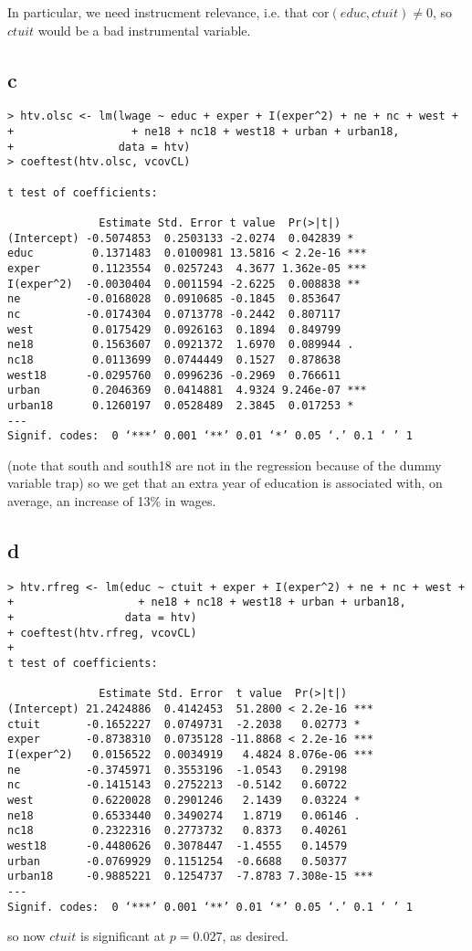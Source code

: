 \documentclass[12pt,letterpaper]{article}
\theoremstyle{definition}
\begin{document}
In particular, we need instrucment relevance, i.e. that $\text{cor}(educ, ctuit) \neq 0$, so $ctuit$ would be a bad instrumental variable.

\subsection*{c}

\begin{Verbatim}[fontsize=\small]
> htv.olsc <- lm(lwage ~ educ + exper + I(exper^2) + ne + nc + west +
+                  + ne18 + nc18 + west18 + urban + urban18,
+                data = htv)
> coeftest(htv.olsc, vcovCL)

t test of coefficients:

              Estimate Std. Error t value  Pr(>|t|)
(Intercept) -0.5074853  0.2503133 -2.0274  0.042839 *
educ         0.1371483  0.0100981 13.5816 < 2.2e-16 ***
exper        0.1123554  0.0257243  4.3677 1.362e-05 ***
I(exper^2)  -0.0030404  0.0011594 -2.6225  0.008838 **
ne          -0.0168028  0.0910685 -0.1845  0.853647
nc          -0.0174304  0.0713778 -0.2442  0.807117
west         0.0175429  0.0926163  0.1894  0.849799
ne18         0.1563607  0.0921372  1.6970  0.089944 .
nc18         0.0113699  0.0744449  0.1527  0.878638
west18      -0.0295760  0.0996236 -0.2969  0.766611
urban        0.2046369  0.0414881  4.9324 9.246e-07 ***
urban18      0.1260197  0.0528489  2.3845  0.017253 *
---
Signif. codes:  0 ‘***’ 0.001 ‘**’ 0.01 ‘*’ 0.05 ‘.’ 0.1 ‘ ’ 1
\end{Verbatim}
(note that south and south18 are not in the regression because of the dummy variable trap) so we get that an extra year of education is associated with, on average, an increase of 13\% in wages.

\subsection*{d}

\begin{Verbatim}[fontsize=\small]
> htv.rfreg <- lm(educ ~ ctuit + exper + I(exper^2) + ne + nc + west +
+                   + ne18 + nc18 + west18 + urban + urban18,
+                 data = htv)
+ coeftest(htv.rfreg, vcovCL)
+
t test of coefficients:

              Estimate Std. Error  t value  Pr(>|t|)
(Intercept) 21.2424886  0.4142453  51.2800 < 2.2e-16 ***
ctuit       -0.1652227  0.0749731  -2.2038   0.02773 *
exper       -0.8738310  0.0735128 -11.8868 < 2.2e-16 ***
I(exper^2)   0.0156522  0.0034919   4.4824 8.076e-06 ***
ne          -0.3745971  0.3553196  -1.0543   0.29198
nc          -0.1415143  0.2752213  -0.5142   0.60722
west         0.6220028  0.2901246   2.1439   0.03224 *
ne18         0.6533440  0.3490274   1.8719   0.06146 .
nc18         0.2322316  0.2773732   0.8373   0.40261
west18      -0.4480626  0.3078447  -1.4555   0.14579
urban       -0.0769929  0.1151254  -0.6688   0.50377
urban18     -0.9885221  0.1254737  -7.8783 7.308e-15 ***
---
Signif. codes:  0 ‘***’ 0.001 ‘**’ 0.01 ‘*’ 0.05 ‘.’ 0.1 ‘ ’ 1
\end{Verbatim}
so now $ctuit$ is significant at $p = 0.027$, as desired.
\end{document}
